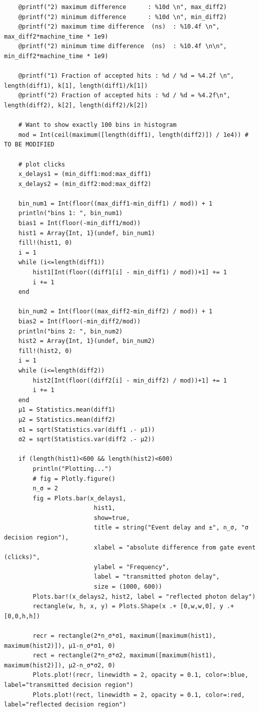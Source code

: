 \documentclass[10pt, final]{article}
\begin{document}
\begin{mdframed}
\begin{lstlisting}
    @printf("2) maximum difference      : %10d \n", max_diff2)
    @printf("2) minimum difference      : %10d \n", min_diff2)
    @printf("2) maximum time difference  (ns)  : %10.4f \n", max_diff2*machine_time * 1e9)
    @printf("2) minimum time difference  (ns)  : %10.4f \n\n", min_diff2*machine_time * 1e9)

    @printf("1) Fraction of accepted hits : %d / %d = %4.2f \n", length(diff1), k[1], length(diff1)/k[1])
    @printf("2) Fraction of accepted hits : %d / %d = %4.2f\n", length(diff2), k[2], length(diff2)/k[2])

    # Want to show exactly 100 bins in histogram
    mod = Int(ceil(maximum([length(diff1), length(diff2)]) / 1e4)) # TO BE MODIFIED

    # plot clicks 
    x_delays1 = (min_diff1:mod:max_diff1)
    x_delays2 = (min_diff2:mod:max_diff2)

    bin_num1 = Int(floor((max_diff1-min_diff1) / mod)) + 1
    println("bins 1: ", bin_num1)
    bias1 = Int(floor(-min_diff1/mod))
    hist1 = Array{Int, 1}(undef, bin_num1)
    fill!(hist1, 0)
    i = 1
    while (i<=length(diff1))
        hist1[Int(floor((diff1[i] - min_diff1) / mod))+1] += 1
        i += 1
    end

    bin_num2 = Int(floor((max_diff2-min_diff2) / mod)) + 1
    bias2 = Int(floor(-min_diff2/mod))
    println("bins 2: ", bin_num2)
    hist2 = Array{Int, 1}(undef, bin_num2)
    fill!(hist2, 0)
    i = 1
    while (i<=length(diff2))
        hist2[Int(floor((diff2[i] - min_diff2) / mod))+1] += 1
        i += 1
    end
    μ1 = Statistics.mean(diff1)
    μ2 = Statistics.mean(diff2)
    σ1 = sqrt(Statistics.var(diff1 .- μ1))
    σ2 = sqrt(Statistics.var(diff2 .- μ2)) 

    if (length(hist1)<600 && length(hist2)<600)
        println("Plotting...")
        # fig = Plotly.figure()
        n_σ = 2
        fig = Plots.bar(x_delays1,
                         hist1,
                         show=true,
                         title = string("Event delay and ±", n_σ, "σ decision region"),
                         xlabel = "absolute difference from gate event (clicks)",
                         ylabel = "Frequency", 
                         label = "transmitted photon delay", 
                         size = (1000, 600))
        Plots.bar!(x_delays2, hist2, label = "reflected photon delay")
        rectangle(w, h, x, y) = Plots.Shape(x .+ [0,w,w,0], y .+ [0,0,h,h])

        recr = rectangle(2*n_σ*σ1, maximum([maximum(hist1), maximum(hist2)]), μ1-n_σ*σ1, 0)
        rect = rectangle(2*n_σ*σ2, maximum([maximum(hist1), maximum(hist2)]), μ2-n_σ*σ2, 0)
        Plots.plot!(recr, linewidth = 2, opacity = 0.1, color=:blue, label="transmitted decision region")
        Plots.plot!(rect, linewidth = 2, opacity = 0.1, color=:red, label="reflected decision region")


\end{lstlisting}
\end{mdframed}
\end{document}
